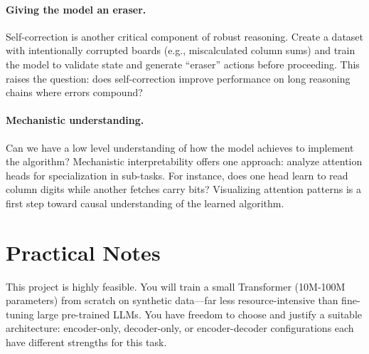 \documentclass[11pt, a4paper]{article}
\begin{document}
\paragraph{Giving the model an eraser.} Self-correction is another critical component of robust reasoning. Create a dataset with intentionally corrupted boards (e.g., miscalculated column sums) and train the model to validate state and generate ``eraser'' actions before proceeding. This raises the question: does self-correction improve performance on long reasoning chains where errors compound?


\paragraph{Mechanistic understanding.} Can we have a low level understanding of how the model achieves to implement the algorithm? Mechanistic interpretability offers one approach: analyze attention heads for specialization in sub-tasks. For instance, does one head learn to read column digits while another fetches carry bits? Visualizing attention patterns is a first step toward causal understanding of the learned algorithm.


\section{Practical Notes}

This project is highly feasible. You will train a small Transformer (10M-100M parameters) from scratch on synthetic data—far less resource-intensive than fine-tuning large pre-trained LLMs. You have freedom to choose and justify a suitable architecture: encoder-only, decoder-only, or encoder-decoder configurations each have different strengths for this task.




\end{document}
